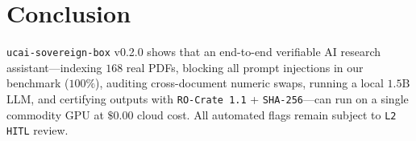 \documentclass[10pt,twocolumn]{article}
\begin{document}
\section{Conclusion}
\texttt{ucai-sovereign-box} v0.2.0 shows that an end-to-end verifiable AI research assistant---indexing $168$ real PDFs, blocking all prompt injections in our benchmark ($100\%$), auditing cross-document numeric swaps, running a local $1.5\text{B}$ LLM, and certifying outputs with \texttt{RO-Crate 1.1} + \texttt{SHA-256}---can run on a single commodity GPU at $\$0.00$ cloud cost. All automated flags remain subject to \texttt{L2 HITL} review.



\end{document}
